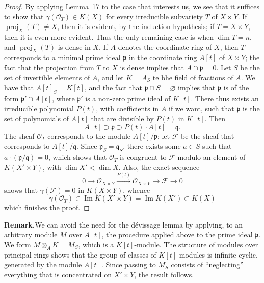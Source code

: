 \documentclass{article}
\newenvironment{rmenv}[1]
  {\phantomsection\par\medskip\noindent\textbf{#1.}\rmfamily}
  {\medskip}
\newcommand{\scr}[1]{{\mathscr{#1}}}
\DeclareMathOperator{\proj}{proj}
\newcommand{\oldpage}[1]{\marginpar{\footnotesize$\Big\vert$ \textit{p.~#1}}}
\begin{document}
\begin{proof}
  By applying \hyperref[lemma17]{Lemma~17} to the case that interests us, we see that it suffices to show that $\gamma(\scr{O}_T)\in K(X)$ for every irreducible subvariety $T$ of $X\times Y$.
  If $\proj_X(T)\neq X$, then it is evident, by the induction hypothesis;
  if $T=X\times Y$, then it is even more evident.
  Thus the only remaining case is when $\dim T=n$, and $\proj_X(T)$ is dense in $X$.
  If $A$ denotes the coordinate ring of $X$, then $T$ corresponds to a minimal prime ideal $\mathfrak{p}$ in the coordinate ring $A[t]$ of $X\times Y$;
  the fact that the projection from $T$ to $X$ is dense implies that $A\cap\mathfrak{p}=0$.
  Let $S$ be the set of invertible elements of $A$, and let $K=A_S$ te bhe field of fractions of $A$.
  We have that $A[t]_S=K[t]$, and the fact that $\mathfrak{p}\cap S=\varnothing$ implies that $\mathfrak{p}$ is of the form $\mathfrak{p}'\cap A[t]$, where $\mathfrak{p}'$ is a non-zero prime ideal of $K[t]$.
  There thus exists an irreducible polynomial $P(t)$, with coefficients in $A$ if we want, such that $\mathfrak{p}$ is the set of polynomials of $A[t]$ that are divisible by $P(t)$ in $K[t]$.
  Then
  \[
    A[t] \supset \mathfrak{p} \supset P(t)\cdot A[t] = \mathfrak{q}.
  \]
  The sheaf $\scr{O}_T$ corresponds to the module $A[t]/\mathfrak{p}$;
  let $\scr{F}$ be the sheaf that corresponds to $A[t]/\mathfrak{q}$.
  Since $\mathfrak{p}_S=\mathfrak{q}_S$, there exists some $a\in S$ such that $a\cdot(\mathfrak{p}/\mathfrak{q})=0$, which shows that $\scr{O}_T$ is congruent to $\scr{F}$ modulo an element of $K(X'\times Y)$, with $\dim X'<\dim X$.
  Also, the exact sequence
  \[
    0 \to \scr{O}_{X\times Y} \xrightarrow{P(t)} \scr{O}_{X\times Y} \to \scr{F} \to 0
  \]
  shows that $\gamma(\scr{F})=0$ in $K(X\times Y)$, whence
  \[
    \gamma(\scr{O}_T) \in \operatorname{Im} K(X'\times Y) = \operatorname{Im} K(X') \subset K(X)
  \]
  which finishes the proof.
\end{proof}

\oldpage{118}
\begin{rmenv}{Remark}[Cartier]
  We can avoid the need for the d\'{e}vissage lemma by applying, to an arbitrary module $M$ over $A[t]$, the procedure applied above to the prime ideal $\mathfrak{p}$.
  We form $M\otimes_A K=M_S$, which is a $K[t]$-module.
  The structure of modules over principal rings shows that the group of classes of $K[t]$-modules is infinite cyclic, generated by the module $A[t]$.
  Since passing to $M_S$ consists of ``neglecting'' everything that is concentrated on $X'\times Y$, the result follows.
\end{rmenv}
\end{document}
